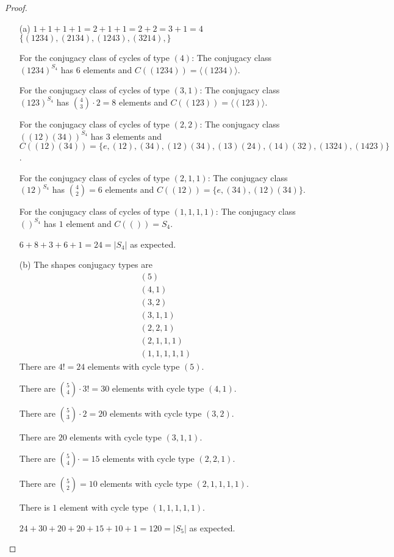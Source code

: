 \documentclass{article}
\begin{document}
\begin{proof}
\begin{itemize}
    \item[(a)] $1+1+1+1=2+1+1=2+2=3+1=4$
    $\{(1234),(2134),(1243),(3214),\}$
    
    For the conjugacy class of cycles of type $(4)$:
    The conjugacy class $(1234)^{S_4}$ has $6$ elements and $C((1234))=\langle (1234)\rangle$.

    For the conjugacy class of cycles of type $(3,1)$:
    The conjugacy class $(123)^{S_4}$ has ${4\choose3}\cdot 2=8$ elements and $C((123))=\langle(123)\rangle$.

    For the conjugacy class of cycles of type $(2,2)$:
    The conjugacy class $((12)(34))^{S_4}$ has $3$ elements and $C((12)(34))=\{e,(12),(34),(12)(34),(13)(24),(14)(32),(1324),(1423)\}$.

    For the conjugacy class of cycles of type $(2,1,1)$:
    The conjugacy class $(12)^{S_4}$ has ${4\choose 2}=6$ elements and $C((12))=\{e,(34),(12)(34)\}$.

    For the conjugacy class of cycles of type $(1,1,1,1)$:
    The conjugacy class $()^{S_4}$ has $1$ element and $C(())=S_4$.

    $6+8+3+6+1=24=|S_4|$ as expected.
    \item[(b)] The shapes conjugacy types are\begin{align*}
        (5)\\
        (4,1)\\
        (3,2)\\
        (3,1,1)\\
        (2,2,1)\\
        (2,1,1,1)\\
        (1,1,1,1,1)
    \end{align*}
    There are $4!=24$ elements with cycle type $(5)$.

    There are ${5\choose 4}\cdot 3!=30$ elements with cycle type $(4,1)$.

    There are ${5\choose 3}\cdot 2=20$ elements with cycle type $(3,2)$.

    There are $20$ elements with cycle type $(3,1,1)$.

    There are ${5\choose 4}\cdot=15$ elements with cycle type $(2,2,1)$.

    There are ${5\choose 2}=10$ elements with cycle type $(2,1,1,1,1)$.

    There is $1$ element with cycle type $(1,1,1,1,1)$.

    $24+30+20+20+15+10+1=120=|S_5|$ as expected.
\end{itemize}
\end{proof}
\end{document}
